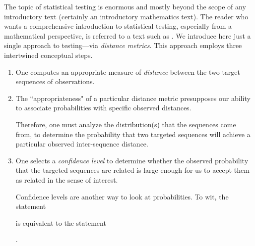 The topic of statistical testing is enormous and mostly beyond the scope of any introductory text (certainly an introductory mathematics text).  The reader who wants a comprehensive introduction to statistical testing, especially from a mathematical perspective, is referred to a text such as \cite{Hoel58}.   We introduce here just a single approach to testing---via {\em distance metrics}.  This approach employs three intertwined conceptual steps.
\begin{enumerate}
\item
One computes an appropriate measure of {\em distance} between the two target sequences of observations.
\medskip\item
The ``appropriateness" of a particular distance metric presupposes our ability to associate probabilities with specific observed distances.

\smallskip

Therefore, one must analyze the distribution(s) that the sequences come from, to determine the probability that two targeted sequences will achieve a particular observed inter-sequence distance.
\medskip\item
One selects a {\em confidence level} to determine whether the observed probability that the targeted sequences are related is large enough for us to accept them as related in the sense of interest.

\medskip

Confidence levels are another way to look at probabilities.  To wit, the statement

\hspace*{.2in}{\em the probability that the assertion $A$ is true is $p\%$}

is equivalent to the statement

\hspace*{.2in}{\em assertion $A$ is true with a confidence level of $(100-p)\%$}.
\end{enumerate}

\bigskip

\noindent {}

